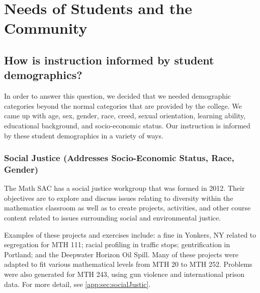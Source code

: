 \chapter{Needs of Students and the Community}
\section{How is instruction informed by student demographics?}
In order to answer this question, we decided that we needed demographic categories beyond the normal categories that are provided by the college. We came up with age, sex, gender, race, creed, sexual orientation, learning ability, educational background, and socio-economic status. Our instruction is informed by these student demographics in a variety of ways.
\label{needs:sec:definitiondiversity}



\subsection{Social Justice (Addresses Socio-Economic Status, Race, Gender)}
The Math SAC has a social justice workgroup that was formed in 2012.  Their objectives are to explore and discuss issues relating to diversity within the mathematics classroom as well as to create projects, activities, and other course content related to issues surrounding social and environmental justice.

Examples of these projects and exercises include: a fine in Yonkers, NY related to segregation
for MTH 111; racial profiling in traffic stops; gentrification in Portland; and the Deepwater Horizon Oil Spill. Many of these projects were adapted to fit various mathematical levels from MTH 20 to MTH 252. Problems were also generated for MTH 243, using gun violence and international prison data. For more detail, see \vref{app:sec:socialJustic}.

